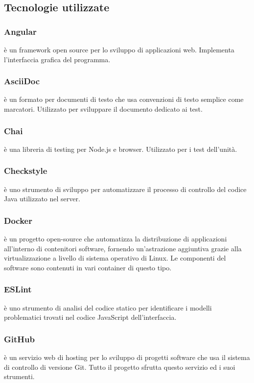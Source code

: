 \subsection{Tecnologie utilizzate}

	\subsubsection{Angular}
	 è un framework open source per lo sviluppo di applicazioni web. Implementa l'interfaccia grafica del programma.
	
	\subsubsection{AsciiDoc}
	 è un formato per documenti di testo che usa convenzioni di testo semplice come marcatori. Utilizzato per sviluppare il documento dedicato ai test.
	
	\subsubsection{Chai}
	 è una libreria di testing per Node.js e browser. Utilizzato per i test dell'unità.
	
	\subsubsection{Checkstyle}
	 è uno strumento di sviluppo per automatizzare il processo di controllo del codice Java utilizzato nel server.
	
	\subsubsection{Docker}
	 è un progetto open-source che automatizza la distribuzione di applicazioni all’interno di contenitori software, fornendo un’astrazione aggiuntiva grazie alla virtualizzazione a livello di sistema operativo di Linux. Le componenti del software sono contenuti in vari container di questo tipo.
	
	\subsubsection{ESLint}
	 è uno strumento di analisi del codice statico per identificare i modelli problematici trovati nel codice JavaScript dell'interfaccia.
	
	\subsubsection{GitHub}
	 è un servizio web di hosting per lo sviluppo di progetti software che usa il sistema di controllo di versione Git. Tutto il progetto sfrutta questo servizio ed i suoi strumenti.
	
